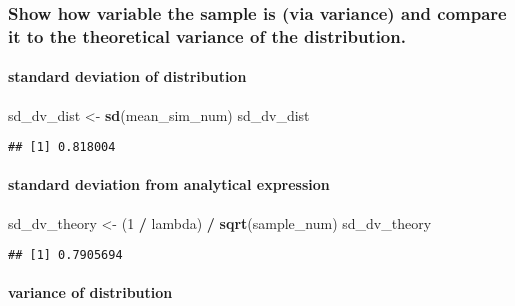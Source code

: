 \documentclass[
]{article}
\newenvironment{Shaded}{\begin{snugshade}}{\end{snugshade}}
\newcommand{\DecValTok}[1]{\textcolor[rgb]{0.00,0.00,0.81}{#1}}
\newcommand{\KeywordTok}[1]{\textcolor[rgb]{0.13,0.29,0.53}{\textbf{#1}}}
\newcommand{\NormalTok}[1]{#1}
\newcommand{\OperatorTok}[1]{\textcolor[rgb]{0.81,0.36,0.00}{\textbf{#1}}}
\newcommand{\StringTok}[1]{\textcolor[rgb]{0.31,0.60,0.02}{#1}}
\begin{document}
\hypertarget{show-how-variable-the-sample-is-via-variance-and-compare-it-to-the-theoretical-variance-of-the-distribution.}{%
\subsubsection{Show how variable the sample is (via variance) and
compare it to the theoretical variance of the
distribution.}\label{show-how-variable-the-sample-is-via-variance-and-compare-it-to-the-theoretical-variance-of-the-distribution.}}

\hypertarget{standard-deviation-of-distribution}{%
\paragraph{standard deviation of
distribution}\label{standard-deviation-of-distribution}}

\begin{Shaded}
\begin{Highlighting}[]
\NormalTok{sd\_dv\_dist \textless{}{-}}\StringTok{ }\KeywordTok{sd}\NormalTok{(mean\_sim\_num)}
\NormalTok{sd\_dv\_dist}
\end{Highlighting}
\end{Shaded}

\begin{verbatim}
## [1] 0.818004
\end{verbatim}

\hypertarget{standard-deviation-from-analytical-expression}{%
\paragraph{standard deviation from analytical
expression}\label{standard-deviation-from-analytical-expression}}

\begin{Shaded}
\begin{Highlighting}[]
\NormalTok{sd\_dv\_theory \textless{}{-}}\StringTok{ }\NormalTok{(}\DecValTok{1}  \OperatorTok{/}\StringTok{ }\NormalTok{lambda) }\OperatorTok{/}\StringTok{ }\KeywordTok{sqrt}\NormalTok{(sample\_num)}
\NormalTok{sd\_dv\_theory}
\end{Highlighting}
\end{Shaded}

\begin{verbatim}
## [1] 0.7905694
\end{verbatim}

\hypertarget{variance-of-distribution}{%
\paragraph{variance of distribution}\label{variance-of-distribution}}
\end{document}
